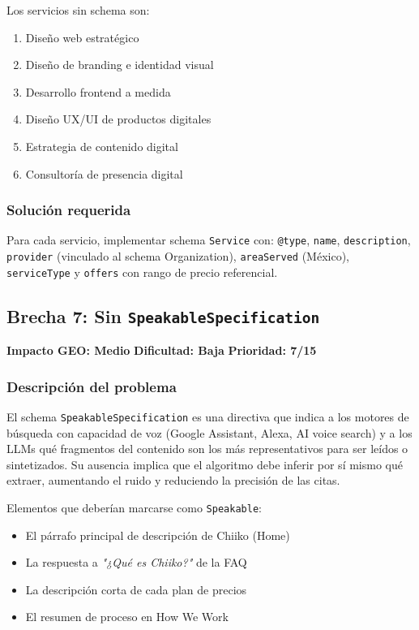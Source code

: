 \documentclass[12pt, a4paper]{article}
\begin{document}
Los servicios sin schema son:
\begin{enumerate}[itemsep=3pt]
  \item Diseño web estratégico
  \item Diseño de branding e identidad visual
  \item Desarrollo frontend a medida
  \item Diseño UX/UI de productos digitales
  \item Estrategia de contenido digital
  \item Consultoría de presencia digital
\end{enumerate}

\subsubsection{Solución requerida}

Para cada servicio, implementar schema \texttt{Service} con:
\texttt{@type}, \texttt{name}, \texttt{description}, \texttt{provider} (vinculado al schema Organization), \texttt{areaServed} (México), \texttt{serviceType} y \texttt{offers} con rango de precio referencial.

\subsection{Brecha 7: Sin \texttt{SpeakableSpecification}}

\begin{medbox}
\textbf{Impacto GEO: Medio} \quad \textbf{Dificultad: Baja} \quad \textbf{Prioridad: 7/15}
\end{medbox}

\subsubsection{Descripción del problema}

El schema \texttt{SpeakableSpecification} es una directiva que indica a los motores de búsqueda con capacidad de voz (Google Assistant, Alexa, AI voice search) y a los LLMs qué fragmentos del contenido son los más representativos para ser leídos o sintetizados. Su ausencia implica que el algoritmo debe inferir por sí mismo qué extraer, aumentando el ruido y reduciendo la precisión de las citas.

Elementos que deberían marcarse como \texttt{Speakable}:
\begin{itemize}[itemsep=3pt]
  \item El párrafo principal de descripción de Chiiko (Home)
  \item La respuesta a \textit{"¿Qué es Chiiko?"} de la FAQ
  \item La descripción corta de cada plan de precios
  \item El resumen de proceso en How We Work
\end{itemize}
\end{document}
